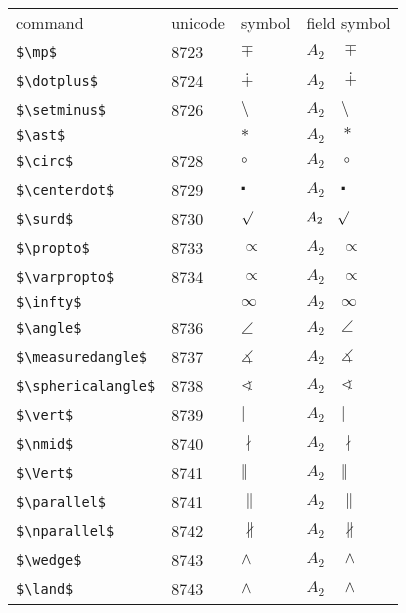 \documentclass{article}
\begin{document}
\begin{table}
\begin{center}
\begin{tabular}{llll}
 command                  & unicode & symbol            & field symbol\\
 \verb#$\mp$#             & 8723    & $\mp$             & $A_2\quad \mp$\\
 \verb#$\dotplus$#        & 8724    & $\dotplus$        & $A_2\quad \dotplus$\\
 \verb#$\setminus$#       & 8726    & $\setminus$       & $A_2\quad \setminus$\\
 \verb#$\ast$#            &         & $\ast$            & $A_2\quad \ast$\\
 \verb#$\circ$#           & 8728    & $\circ$           & $A_2\quad \circ$\\
 \verb#$\centerdot$#      & 8729    & $\centerdot$      & $A_2\quad \centerdot$\\
 \verb#$\surd$#           & 8730    & $\surd$           & $A_2\quad \surd$\\
 \verb#$\propto$#         & 8733    & $\propto$         & $A_2\quad \propto$\\
 \verb#$\varpropto$#      & 8734    & $\varpropto$      & $A_2\quad \varpropto$\\
 \verb#$\infty$#          &         & $\infty$          & $A_2\quad \infty$\\
 \verb#$\angle$#          & 8736    & $\angle$          & $A_2\quad \angle$\\
 \verb#$\measuredangle$#  & 8737    & $\measuredangle$  & $A_2\quad \measuredangle$\\
 \verb#$\sphericalangle$# & 8738    & $\sphericalangle$ & $A_2\quad \sphericalangle$\\
 \verb#$\vert$#           & 8739    & $\vert$           & $A_2\quad \vert$\\
 \verb#$\nmid$#           & 8740    & $\nmid$           & $A_2\quad \nmid$\\
 \verb#$\Vert$#           & 8741    & $\Vert$           & $A_2\quad \Vert$\\
 \verb#$\parallel$#       & 8741    & $\parallel$       & $A_2\quad \parallel$\\
 \verb#$\nparallel$#      & 8742    & $\nparallel$      & $A_2\quad \nparallel$\\
 \verb#$\wedge$#          & 8743    & $\wedge$          & $A_2\quad \wedge$\\
 \verb#$\land$#           & 8743    & $\land$           & $A_2\quad \land$\\

\end{tabular}
\end{center}
\end{table}
\end{document}
